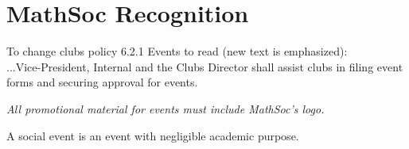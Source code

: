 \documentclass[12pt, letterpaper]{article}
\begin{document}
\newpage
{}


\newpage
{}
\section*{MathSoc Recognition}
To change clubs policy 6.2.1 Events to read (new text is emphasized):\\

...Vice-President, Internal and the Clubs Director shall assist clubs in filing
event forms and securing approval for events.

\emph{All promotional material for events must include MathSoc's logo.}

A social event is an event with negligible academic purpose.
\end{document}
